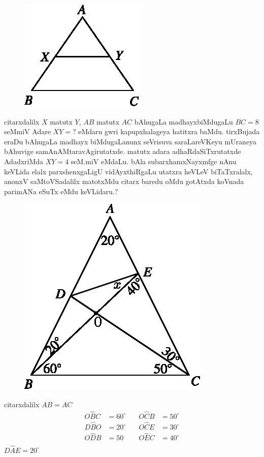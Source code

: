 \begin{figure}[H]
\centering
\includegraphics{src/figures/m_179d.eps}
\end{figure}
citarxdalilx $X$ matutx $Y$, $AB$ matutx $AC$ bAhugaLa madhayxbiMdugaLu $BC=8$ seMmiV Adare $XY=?$ eMdaru gwri kapupxhalageya hatitxra baMdu. tirxBujada eraDu bAhugaLa madhayx biMdugaLanunx seVrisuva saraLareVKeyu mUraneya bAhuvige samAnAMtaravAgirutatxde. matutx adara adhaRdaSiTxrutatxde AdadxriMda $XY=4$ seM.miV eMdaLu. bAla subarxhamxNayxmfge nAnu keVLida elalx parxshenxgaLigU vidAyxthiRgaLu utatxra heVLeV biTaTxralalx, anonxV saMtoVSadalilx matotxMdu citarx baredu oMdu gotAtxda koVnada parimANa eSuTx eMdu keVLidaru.?
\begin{figure}[H]
\centering
\includegraphics{src/figures/m_181.eps}
\end{figure}

\begin{center} 
citarxdalilx $AB=AC$
$$
\begin{matrix}
O\widehat{B}C &=60^\circ & \quad  O\widehat{C}B &=50^\circ\\
D\widehat{B}O &=20^\circ & \quad O\widehat{C}E &=30^\circ\\
O\widehat{D}B &=50 & \quad O\widehat{E}C & =40^\circ\\
\end{matrix}
$$
$D\widehat{A}E =20^\circ$
\end{center}

